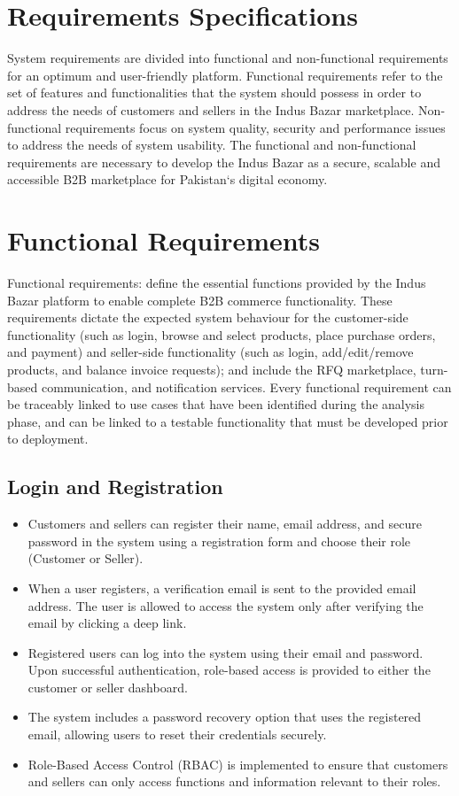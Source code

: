 \section{Requirements Specifications}
System requirements are divided into functional and non-functional requirements for an optimum and user-friendly platform. Functional requirements refer to the set of features and functionalities that the system should possess in order to address the needs of customers and sellers in the Indus Bazar marketplace. Non-functional requirements focus on system quality, security and performance issues to address the needs of system usability.  The functional and non-functional requirements are necessary to develop the Indus Bazar as a secure, scalable and accessible B2B marketplace for Pakistan‘s digital economy.

\section{Functional Requirements}
Functional requirements: define the essential functions provided by the Indus Bazar platform to enable complete B2B commerce functionality. These requirements dictate the expected system behaviour for the customer-side functionality (such as login,  browse and select products,  place purchase orders,  and payment) and seller-side functionality (such as login,  add/edit/remove products,  and balance invoice requests); and include the RFQ marketplace,  turn-based communication, and notification services.  Every functional requirement can be traceably linked to use cases that have been identified during the analysis phase,  and can be linked to a testable functionality that must be developed prior to deployment.

\subsection{Login and Registration}
\begin{itemize}
    \item Customers and sellers can register their name, email address, and secure password in the system using a registration form and choose their role (Customer or Seller).
    
    \item When a user registers, a verification email is sent to the provided email address. The user is allowed to access the system only after verifying the email by clicking a deep link.
    
    \item Registered users can log into the system using their email and password. Upon successful authentication, role-based access is provided to either the customer or seller dashboard.
    
    \item The system includes a password recovery option that uses the registered email, allowing users to reset their credentials securely.
    
    \item Role-Based Access Control (RBAC) is implemented to ensure that customers and sellers can only access functions and information relevant to their roles.
\end{itemize}

